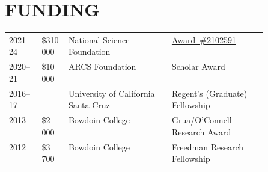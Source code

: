\section*{FUNDING}

\begin{tabular}{@{}p{.1\linewidth} p{0.1\linewidth} p{0.4\linewidth} @{}p{.4\linewidth}} 
    2021--24 & \$310\,000 & National Science Foundation & \href{https://www.nsf.gov/awardsearch/showAward?AWD_ID=2102591}{Award~\#2102591}\\
    2020--21 & \$10\,000 & ARCS Foundation & Scholar Award \\
    2016--17 &  & University of California Santa Cruz  & Regent's (Graduate) Fellowship \\
    2013 & \$2\,000 & Bowdoin College & Grua/O'Connell Research Award  \\ 
    2012 & \$3\,700 & Bowdoin College & Freedman Research Fellowship \\
\end{tabular}